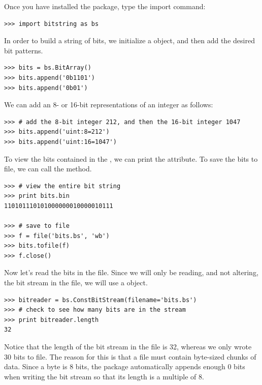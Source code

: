 Once you have installed the package, type the import command:
\begin{lstlisting}
>>> import bitstring as bs
\end{lstlisting}
In order to build a string of bits, we initialize a  object, and then add the
desired bit patterns.
\begin{lstlisting}
>>> bits = bs.BitArray()
>>> bits.append('0b1101')
>>> bits.append('0b01')
\end{lstlisting}
We can add an 8- or 16-bit representations of an integer as follows:
\begin{lstlisting}
>>> # add the 8-bit integer 212, and then the 16-bit integer 1047
>>> bits.append('uint:8=212')
>>> bits.append('uint:16=1047')
\end{lstlisting}
To view the bits contained in the , we can print the  attribute.
To save the bits to file, we can call the  method.
\begin{lstlisting}
>>> # view the entire bit string
>>> print bits.bin
110101110101000000010000010111

>>> # save to file
>>> f = file('bits.bs', 'wb')
>>> bits.tofile(f)
>>> f.close()
\end{lstlisting}

Now let's read the bits in the file. Since we will only be reading, and not altering,
the bit stream in the file, we will use a  object.
\begin{lstlisting}
>>> bitreader = bs.ConstBitStream(filename='bits.bs')
>>> # check to see how many bits are in the stream
>>> print bitreader.length
32
\end{lstlisting}
Notice that the length of the bit stream in the file is 32, whereas we only wrote 30 bits to file.
The reason for this is that a file must contain byte-sized chunks of data. Since a byte is 8 bits,
the  package automatically appends enough 0 bits when writing the bit stream so that
its length is a multiple of 8.

